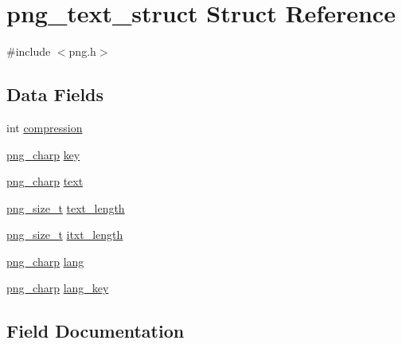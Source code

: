 \hypertarget{structpng__text__struct}{}\section{png\+\_\+text\+\_\+struct Struct Reference}
\label{structpng__text__struct}


{\ttfamily \#include $<$png.\+h$>$}

\subsection*{Data Fields}
\begin{DoxyCompactItemize}
\item 
int \hyperlink{structpng__text__struct_ad09c73bc91f014ad352abfbb3b61b8d1}{compression}
\item 
\hyperlink{libpng16_2pngconf_8h_a0d08bb02251d02830803ff5d2d449750}{png\+\_\+charp} \hyperlink{structpng__text__struct_a99c3063a15889d2fc242f24b69c567ef}{key}
\item 
\hyperlink{libpng16_2pngconf_8h_a0d08bb02251d02830803ff5d2d449750}{png\+\_\+charp} \hyperlink{structpng__text__struct_a27492227bc525bee14abcc8002084edd}{text}
\item 
\hyperlink{libpng16_2pngconf_8h_a975e35d0a699ea3b08b8feef90fd29eb}{png\+\_\+size\+\_\+t} \hyperlink{structpng__text__struct_a26312284ecc7a95e2168a29d0170b411}{text\+\_\+length}
\item 
\hyperlink{libpng16_2pngconf_8h_a975e35d0a699ea3b08b8feef90fd29eb}{png\+\_\+size\+\_\+t} \hyperlink{structpng__text__struct_aca3fd6fec58f54460d57ad07182d570d}{itxt\+\_\+length}
\item 
\hyperlink{libpng16_2pngconf_8h_a0d08bb02251d02830803ff5d2d449750}{png\+\_\+charp} \hyperlink{structpng__text__struct_a803048cbecc84ca530d64db6513f4fc6}{lang}
\item 
\hyperlink{libpng16_2pngconf_8h_a0d08bb02251d02830803ff5d2d449750}{png\+\_\+charp} \hyperlink{structpng__text__struct_a61ee3cba011cf3bdefda49f8f9885482}{lang\+\_\+key}
\end{DoxyCompactItemize}


\subsection{Field Documentation}
\mbox{\label{structpng__text__struct_ad09c73bc91f014ad352abfbb3b61b8d1}} 
